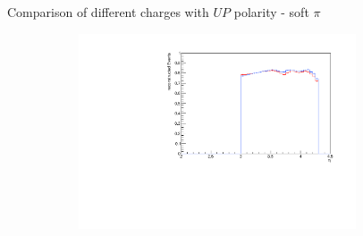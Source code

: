 \documentclass[11pt]{beamer}
\begin{document}
\begin{frame}{Comparison of different charges with $UP$ polarity - soft $\pi$}
\begin{figure}
\begin{subfigure}{0.45\textwidth}
\end{subfigure}
\begin{subfigure}{0.45\textwidth}
\includegraphics[width=0.9\textwidth]{sec/up_pdf/combined/h_eta_reco_SPi.pdf}
\end{subfigure}
\end{figure}
\end{frame}
\end{document}
